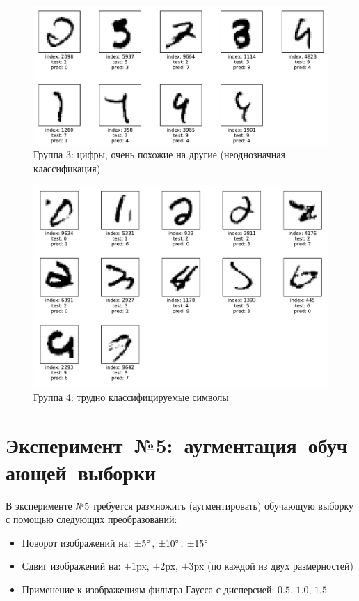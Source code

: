 \documentclass[12pt]{article}
\begin{document}
\begin{figure}[!h]
    \centering
\includegraphics[width=\textwidth]{4_mistakes_similar}
    \caption{Группа 3: цифры, очень похожие на другие (неоднозначная классификация)}
    \label{fig:4_mistakes_similar}
\end{figure}
\begin{figure}[!h]
    \centering
    \includegraphics[width=\textwidth]{4_mistakes_strange}
    \caption{Группа 4: трудно классифицируемые символы}
    \label{fig:4_mistakes_strange}
\end{figure}

\section{\mbox{Эксперимент №5: аугментация обучающей выборки}}

В эксперименте №5 требуется размножить (аугментировать) обучающую выборку с помощью следующих преобразований:
\begin{itemize}
    \item Поворот изображений на: $\pm5\degree$, $\pm10\degree$, $\pm15\degree$
    \item Сдвиг изображений на: $\pm1$px, $\pm2$px, $\pm3$px (по каждой из двух размерностей)
    \item Применение к изображениям фильтра Гаусса с дисперсией: $0.5$, $1.0$, $1.5$
\end{itemize}
\end{document}
